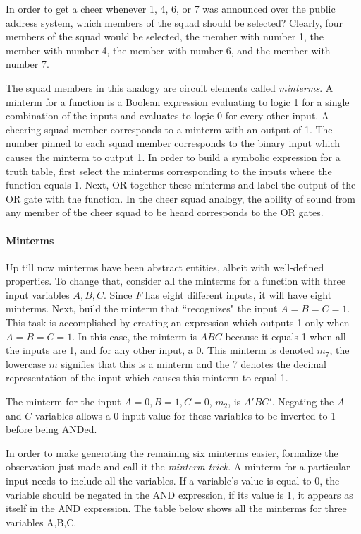In order to get a cheer whenever 1, 4, 6, or 7 was announced 
over the public address system, which members of the squad should be
selected?  Clearly, four members of the squad would be selected, the member
with number 1, the member with number 4, the member with number 6,
and the member with number 7.

The squad members in this analogy are circuit elements called 
\textit{minterms}.  A minterm for a function 
is a Boolean expression evaluating to logic 1 for a single 
combination of the inputs and evaluates to logic 0 for every 
other input.  A cheering squad member corresponds to a minterm with 
an output of 1.  The number pinned to each squad member corresponds
to the binary input which causes the minterm to output 1.  In order 
to build a symbolic expression for a truth table, first select the
minterms corresponding to the inputs where the function equals 1.  
Next, OR together these minterms and label the output of
the OR gate with the function.  In the cheer squad analogy, the ability of
sound from any member of the cheer squad to be heard corresponds
to the OR gates.  

\paragraph{Minterms}
Up till now minterms have been abstract entities, albeit with
well-defined properties.  To change that, consider all
the minterms for a function  with three input variables 
$A,B,C$.  Since $F$ has eight different inputs, it will have eight 
minterms.  Next, build the minterm that ``recognizes" the input $A=B=C=1$.  
This task is accomplished by creating an expression which outputs 1 only when 
$A=B=C=1$.  In this case, the minterm is $ABC$ because it equals 
1 when all the inputs are 1, and for any other input, a 0.
This minterm is denoted $m_7$, the lowercase $m$ signifies that 
this is a minterm and the 7 denotes the decimal representation 
of the input which causes this minterm to equal 1.  

The minterm
for the input $A=0, B=1, C=0$, $m_2$, is $A'BC'$.  Negating the
$A$ and $C$ variables allows a 0 input value for these variables to 
be inverted to 1 before being ANDed.  

In order to make generating 
the remaining six minterms easier, formalize the observation 
just made and call it the \textit{minterm trick}.  
 \label{page:MinTrick}
A minterm for a particular input needs to include all the variables.
If a variable's value is equal to 0, the variable should be negated in 
the AND expression, if its value is 1, it appears as itself in the
AND expression. The table below shows all the minterms for three 
variables A,B,C.

